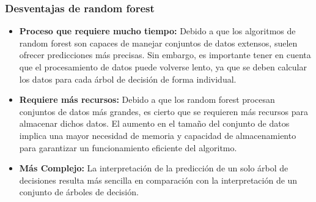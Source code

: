 \subsubsection{Desventajas de random forest}
\begin{itemize}
    \item \textbf{Proceso que requiere mucho tiempo:} Debido a que los algoritmos de random forest son capaces de manejar conjuntos de datos extensos, suelen ofrecer predicciones más precisas. Sin embargo, es importante tener en cuenta que el procesamiento de datos puede volverse lento, ya que se deben calcular los datos para cada árbol de decisión de forma individual.  
    \item \textbf{Requiere más recursos:} Debido a que los random forest procesan conjuntos de datos más grandes, es cierto que se requieren más recursos para almacenar dichos datos. El aumento en el tamaño del conjunto de datos implica una mayor necesidad de memoria y capacidad de almacenamiento para garantizar un funcionamiento eficiente del algoritmo.    
    \item \textbf{Más Complejo:} La interpretación de la predicción de un solo árbol de decisiones resulta más sencilla en comparación con la interpretación de un conjunto de árboles de decisión.
\end{itemize}
